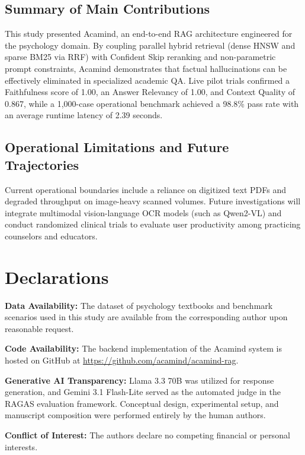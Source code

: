 \documentclass[10pt]{SPIIRAS_Proceedings}
\begin{document}
\subsection{Summary of Main Contributions}
This study presented Acamind, an end-to-end RAG architecture engineered for the psychology domain. By coupling parallel hybrid retrieval (dense HNSW and sparse BM25 via RRF) with Confident Skip reranking and non-parametric prompt constraints, Acamind demonstrates that factual hallucinations can be effectively eliminated in specialized academic QA. Live pilot trials confirmed a Faithfulness score of 1.00, an Answer Relevancy of 1.00, and Context Quality of 0.867, while a 1,000-case operational benchmark achieved a 98.8\% pass rate with an average runtime latency of 2.39 seconds.

\subsection{Operational Limitations and Future Trajectories}
Current operational boundaries include a reliance on digitized text PDFs and degraded throughput on image-heavy scanned volumes. Future investigations will integrate multimodal vision-language OCR models (such as Qwen2-VL) and conduct randomized clinical trials to evaluate user productivity among practicing counselors and educators.

\section*{Declarations}
\leavevmode\par\smallskip
\noindent\textbf{Data Availability:} The dataset of psychology textbooks and benchmark scenarios used in this study are available from the corresponding author upon reasonable request.\par\smallskip
\noindent\textbf{Code Availability:} The backend implementation of the Acamind system is hosted on GitHub at \url{https://github.com/acamind/acamind-rag}.\par\smallskip
\noindent\textbf{Generative AI Transparency:} Llama 3.3 70B was utilized for response generation, and Gemini 3.1 Flash-Lite served as the automated judge in the RAGAS evaluation framework. Conceptual design, experimental setup, and manuscript composition were performed entirely by the human authors.\par\smallskip
\noindent\textbf{Conflict of Interest:} The authors declare no competing financial or personal interests.
\end{document}
